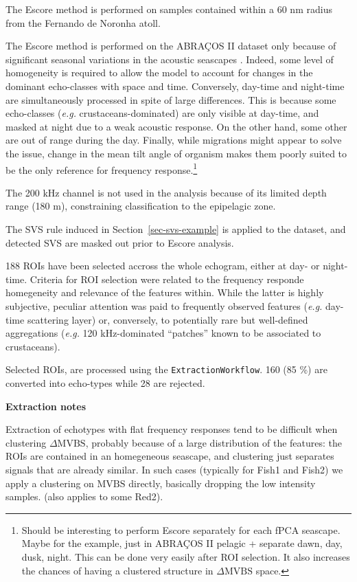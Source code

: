 \documentclass[
  10pt,
  letterpaper,
]{article}
\begin{document}
The Escore method is performed on samples contained within a 60 nm
radius from the Fernando de Noronha atoll.

The Escore method is performed on the ABRAÇOS II dataset only because of
significant seasonal variations in the acoustic seascapes
\citep{ariza2022}. Indeed, some level of homogeneity is required to
allow the model to account for changes in the dominant echo-classes with
space and time. Conversely, day-time and night-time are simultaneously
processed in spite of large differences. This is because some
echo-classes (\emph{e.g.} crustaceans-dominated) are only visible at
day-time, and masked at night due to a weak acoustic response. On the
other hand, some other are out of range during the day. Finally, while
migrations might appear to solve the issue, change in the mean tilt
angle of organism makes them poorly suited to be the only reference for
frequency response.\footnote{Should be interesting to perform Escore
  separately for each fPCA seascape. Maybe for the example, just in
  ABRAÇOS II pelagic + separate dawn, day, dusk, night. This can be done
  very easily after ROI selection. It also increases the chances of
  having a clustered structure in \(\Delta \text{MVBS}\) space.}

The 200 kHz channel is not used in the analysis because of its limited
depth range (180 m), constraining classification to the epipelagic zone.

The SVS rule induced in Section~\ref{sec-svs-example} is applied to the
dataset, and detected SVS are masked out prior to Escore analysis.

188 ROIs have been selected accross the whole echogram, either at day-
or night-time. Criteria for ROI selection were related to the frequency
responde homegeneity and relevance of the features within. While the
latter is highly subjective, peculiar attention was paid to frequently
observed features (\emph{e.g.} day-time scattering layer) or,
conversely, to potentially rare but well-defined aggregations
(\emph{e.g.} 120 kHz-dominated ``patches'' known to be associated to
crustaceans).

Selected ROIs, are processed using the \texttt{ExtractionWorkflow}. 160
(85 \%) are converted into echo-types while 28 are rejected.

\textbf{Extraction notes}

Extraction of echotypes with flat frequency responses tend to be
difficult when clustering \(\Delta \text{MVBS}\), probably because of a
large distribution of the features: the ROIs are contained in an
homegeneous seascape, and clustering just separates signals that are
already similar. In such cases (typically for Fish1 and Fish2) we apply
a clustering on \(\text{MVBS}\) directly, basically dropping the low
intensity samples. (also applies to some Red2).
\end{document}
